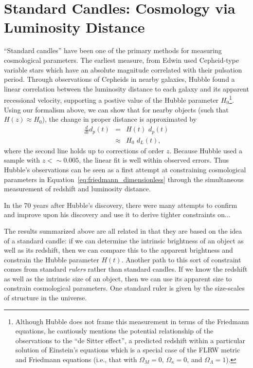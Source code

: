 \section{Standard Candles: Cosmology via Luminosity Distance}
\label{sec:std_candles}
``Standard candles'' have been one of the primary methods for measuring
cosmological parameters.  The earliest measure, from Edwin \citet{hubble1929}
used Cepheid-type variable stars which have an absolute magnitude correlated
with their pulsation period.  Through observations of Cepheids
in nearby galaxies, Hubble found a linear correlation between the
luminosity distance to each galaxy and its apparent recessional velocity,
supporting a postive value of the Hubble parameter $H_0$\footnote{
Although Hubble does not frame this measurement in terms of the Friedmann
equations, he cautiously mentions the potential relationship of the
observations to the ``de Sitter effect'', a predicted redshift within
a particular solution of
Einstein's equations which is a special case of the FLRW metric and
Friedmann equations (i.e., that with $\Omega_M = 0$, $\Omega_\kappa = 0$,
and $\Omega_\Lambda = 1$).}.
Using our formalism above, we can show that for
nearby objects (such that $H(z) \approx H_0$),
the change in proper distance is approximated by
\begin{eqnarray}
  \frac{d}{dt}d_p(t) &=& H(t)\,\, d_p(t) \nonumber\\
                     &\approx& H_0\,\, d_L(t),
\end{eqnarray}
where the second line holds up to corrections of order $z$.  Because
Hubble used a sample with $z <\sim 0.005$, the linear fit is well within
observed errors.
Thus Hubble's observations can be seen as a first attempt at constraining
cosmological parameters in Equation~\ref{eq:friedmann_dimensionless} through
the simultaneous measurement of redshift and luminosity distance.

In the 70 years after Hubble's discovery, there were many attempts to
confirm and improve upon his discovery and use it to derive tighter
constraints on...


The results summarized above are all related in that they are based on the
idea of a standard candle: if we can determine the intrinsic brightness
of an object as well as its redshift, then we can compare this to the
apparent brightness and constrain the Hubble parameter $H(t)$.
Another path to this sort of constraint comes from standard {\it rulers}
rather than standard candles.  If we know the redshift as well as the
intrinsic size of an object, then we can use its apparent size to
constrain cosmological parameters.  One standard ruler is given by the
size-scales of structure in the universe.

